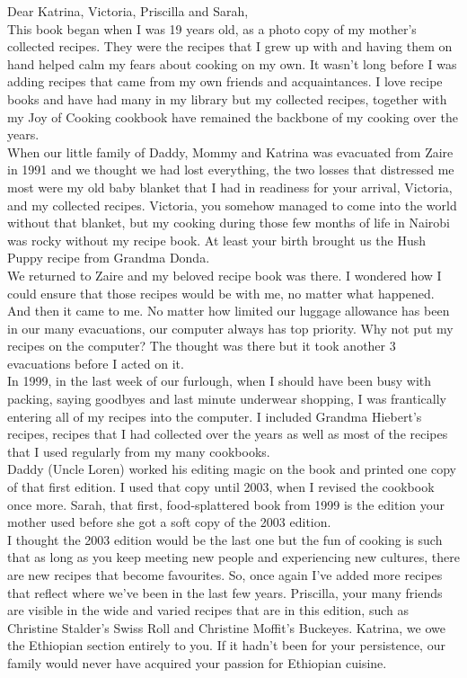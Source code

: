 \documentclass[12pt]{memoir} %
\begin{document}
Dear Katrina, Victoria, Priscilla and Sarah, \\[10pt]
This book began when I was 19 years old, as a photo copy of my mother's collected recipes. They were the recipes that I grew up with and having them on hand helped calm my fears about cooking on my own. It wasn't long before I was adding recipes that came from my own friends and acquaintances. I love recipe books and have had many in my library but my collected recipes, together with my Joy of Cooking cookbook have remained the backbone of my cooking over the years. \\[10pt]
When our little family of Daddy, Mommy and Katrina was evacuated from Zaire in 1991 and we thought we had lost everything, the two losses that distressed me most were my old baby blanket that I had in readiness for your arrival, Victoria, and my collected recipes. Victoria, you somehow managed to come into the world without that blanket, but my cooking during those few months of life in Nairobi was rocky without my recipe book. At least your birth brought us the Hush Puppy recipe from Grandma Donda. \\[10pt]
We returned to Zaire and my beloved recipe book was there. I wondered how I could ensure that those recipes would be with me, no matter what happened. And then it came to me. No matter how limited our luggage allowance has been in our many evacuations, our computer always has top priority. Why not put my recipes on the computer? The thought was there but it took another 3 evacuations before I acted on it. \\[10pt]
In 1999, in the last week of our furlough, when I should have been busy with   packing, saying goodbyes and last minute underwear shopping, I was frantically entering all of my recipes into the computer. I included Grandma Hiebert's recipes, recipes that I had collected over the years as well as most of the recipes that I used regularly from my many cookbooks. \\[10pt]
Daddy (Uncle Loren) worked his editing magic on the book and printed one copy of that first edition. I used that copy until 2003, when I revised the cookbook once more. Sarah, that first, food-splattered book from 1999 is the edition your mother used before she got a soft copy of the 2003 edition. \\[10pt]
I thought the 2003 edition would be the last one but the fun of cooking is such that as long as you keep meeting new people and experiencing new cultures, there are new recipes that become favourites. So, once again I've added more recipes that reflect where we've been in the last few years. Priscilla, your many friends are visible in the wide and varied recipes that are in this edition, such as Christine Stalder's Swiss Roll and Christine Moffit's Buckeyes. Katrina, we owe the Ethiopian section entirely to you. If it hadn't been for your persistence, our family would never have acquired your passion for Ethiopian cuisine. \\[10pt]
\end{document}
